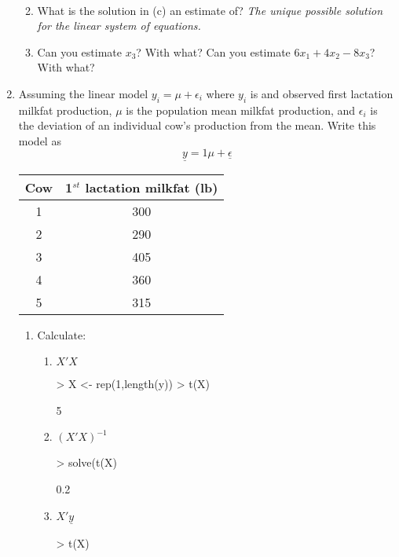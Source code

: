 \documentclass[12pt,a4paper]{paper}
\begin{document}
\begin{enumerate}
\begin{enumerate}
\begin{align*}
\end{align*}
\item What is the solution in (c) an estimate of? \emph{The unique possible solution for the linear system of equations.}
\item Can you estimate $x_{3}$? With what? Can you estimate $6x_{1} + 4x_{2} - 8x_{3}$? With what?
\end{enumerate}
\item Assuming the linear model $y_{i} = \mu + \epsilon_{i}$ where $y_{i}$ is and observed first lactation milkfat production, $\mu$ is the population mean milkfat production, and $\epsilon_{i}$ is the deviation of an individual cow's production from the mean. Write this model as \[\underline{y} = 1\mu + \underline{\epsilon}\]
\begin{center}
\begin{tabular}{|c|c|}
\hline
Cow & 1$^{st}$ lactation milkfat (lb)\\
\hline\hline
1&300\\
\hline
2&290\\
\hline
3&405\\
\hline
4&360\\
\hline
5&315\\
\hline
\end{tabular}
\end{center}
\begin{enumerate}
\item Calculate:
\begin{enumerate}
\item $X'X$
\begin{Schunk}
\begin{Sinput}
> X <- rep(1,length(y))
> t(X) %*% X
\end{Sinput}
\begin{Soutput}
     [,1]
[1,]    5
\end{Soutput}
\end{Schunk}
\item $(X'X)^{-1}$
\begin{Schunk}
\begin{Sinput}
> solve(t(X) %*% X)
\end{Sinput}
\begin{Soutput}
     [,1]
[1,]  0.2
\end{Soutput}
\end{Schunk}
\item $X'\underline{y}$
\begin{Schunk}
\begin{Sinput}
> t(X) %*% y
\end{Sinput}

\end{Schunk}
\end{enumerate}
\end{enumerate}
\end{enumerate}
\end{document}
